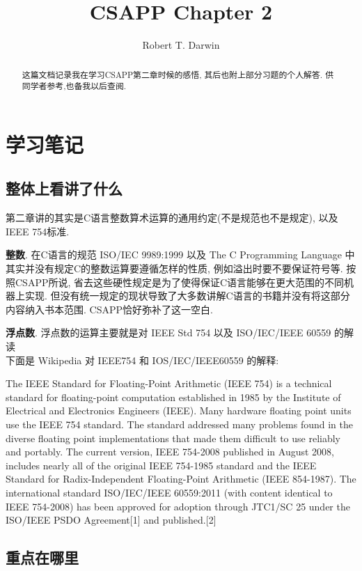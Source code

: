 \documentclass[ a4paper, 10pt ]{article}
\begin{document}
\title{CSAPP Chapter 2}
\author{Robert T. Darwin}
\maketitle
\begin{abstract}
	这篇文档记录我在学习CSAPP第二章时候的感悟, 
	其后也附上部分习题的个人解答. 
	供同学者参考,也备我以后查阅.
\end{abstract}
\tableofcontents
\newpage

\section{学习笔记}

\subsection{整体上看讲了什么}
第二章讲的其实是C语言整数算术运算的通用约定(不是规范也不是规定), 以及IEEE 754标准.

\textbf{整数}. 
在C语言的规范 ISO/IEC 9989:1999 以及 The C Programming Language 中
其实并没有规定C的整数运算要遵循怎样的性质, 例如溢出时要不要保证符号等.
按照CSAPP所说, 省去这些硬性规定是为了使得保证C语言能够在更大范围的不同机器上实现.
但没有统一规定的现状导致了大多数讲解C语言的书籍并没有将这部分内容纳入书本范围.
CSAPP恰好弥补了这一空白.

\textbf{浮点数}. 
浮点数的运算主要就是对 IEEE Std 754 以及 ISO/IEC/IEEE 60559 的解读\\
下面是 Wikipedia 对 IEEE754 和 IOS/IEC/IEEE60559 的解释: 

\small
The IEEE Standard for Floating-Point Arithmetic (IEEE 754) is a technical standard for floating-point computation established in 1985 by the Institute of Electrical and Electronics Engineers (IEEE). Many hardware floating point units use the IEEE 754 standard. The standard addressed many problems found in the diverse floating point implementations that made them difficult to use reliably and portably. The current version, IEEE 754-2008 published in August 2008, includes nearly all of the original IEEE 754-1985 standard and the IEEE Standard for Radix-Independent Floating-Point Arithmetic (IEEE 854-1987). The international standard ISO/IEC/IEEE 60559:2011 (with content identical to IEEE 754-2008) has been approved for adoption through JTC1/SC 25 under the ISO/IEEE PSDO Agreement[1] and published.[2]
\normalsize

\subsection{重点在哪里}
\end{document}
